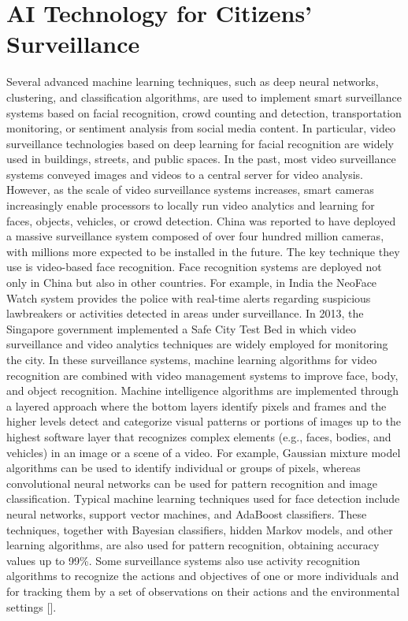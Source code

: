 \section{AI Technology for Citizens' Surveillance}
Several advanced machine learning techniques, such as deep neural networks, clustering, and classification algorithms, are used to implement smart surveillance systems based on facial recognition, crowd counting and detection, transportation monitoring, or sentiment analysis from social media content. In particular, video surveillance technologies based on deep learning for facial recognition are widely used in buildings, streets, and public spaces. In the past, most video surveillance systems conveyed images and videos to a central server for video analysis. However, as the scale of video surveillance systems increases, smart cameras increasingly enable processors to locally run video analytics and learning for faces, objects, vehicles, or crowd detection. China was reported to have deployed a massive surveillance system composed of over four hundred million cameras, with millions more expected to be installed in the future. The key technique they use is video-based face recognition. Face recognition systems are deployed not only in China but also in other countries. For example, in India the NeoFace Watch system provides the police with real-time alerts regarding suspicious lawbreakers or activities detected in areas under surveillance. In 2013, the Singapore government implemented a Safe City Test Bed in which video surveillance and video analytics techniques are widely employed for monitoring the city. In these surveillance systems, machine learning algorithms for video recognition are combined with video management systems to improve face, body, and object recognition. Machine intelligence algorithms are implemented through a layered approach where the bottom layers identify pixels and frames and the higher levels detect and categorize visual patterns or portions of images up to the highest software layer that recognizes complex elements (e.g., faces, bodies, and vehicles) in an image or a scene of a video. For example, Gaussian mixture model algorithms can be used to identify individual or groups of pixels, whereas convolutional neural networks can be used for pattern recognition and image classification. Typical machine learning techniques used for face detection include neural networks, support vector machines, and AdaBoost classifiers. These techniques, together with Bayesian classifiers, hidden Markov models, and other learning algorithms, are also used for pattern recognition, obtaining accuracy values up to 99\%. Some surveillance systems also use activity recognition algorithms to recognize the actions and objectives of one or more individuals and for tracking them by a set of observations on their actions and the environmental settings [\citealt{chap:9:RamamurthyandNirmalya:2018}].

